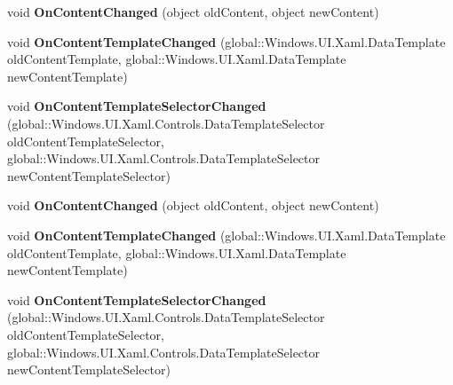 \begin{DoxyCompactItemize}
void {\bfseries On\+Content\+Changed} (object old\+Content, object new\+Content)
\item 
\mbox{\label{interface_windows_1_1_u_i_1_1_xaml_1_1_controls_1_1_i_content_control_overrides_aa589bdda994fa42b1307791c8667e26e}} 
void {\bfseries On\+Content\+Template\+Changed} (global\+::\+Windows.\+U\+I.\+Xaml.\+Data\+Template old\+Content\+Template, global\+::\+Windows.\+U\+I.\+Xaml.\+Data\+Template new\+Content\+Template)
\item 
\mbox{\label{interface_windows_1_1_u_i_1_1_xaml_1_1_controls_1_1_i_content_control_overrides_a5d05f634bc0c8579985bd7fff3790923}} 
void {\bfseries On\+Content\+Template\+Selector\+Changed} (global\+::\+Windows.\+U\+I.\+Xaml.\+Controls.\+Data\+Template\+Selector old\+Content\+Template\+Selector, global\+::\+Windows.\+U\+I.\+Xaml.\+Controls.\+Data\+Template\+Selector new\+Content\+Template\+Selector)
\item 
\mbox{\label{interface_windows_1_1_u_i_1_1_xaml_1_1_controls_1_1_i_content_control_overrides_a927b9318fd0f295313825c3e746af39d}} 
void {\bfseries On\+Content\+Changed} (object old\+Content, object new\+Content)
\item 
\mbox{\label{interface_windows_1_1_u_i_1_1_xaml_1_1_controls_1_1_i_content_control_overrides_aa589bdda994fa42b1307791c8667e26e}} 
void {\bfseries On\+Content\+Template\+Changed} (global\+::\+Windows.\+U\+I.\+Xaml.\+Data\+Template old\+Content\+Template, global\+::\+Windows.\+U\+I.\+Xaml.\+Data\+Template new\+Content\+Template)
\item 
\mbox{\label{interface_windows_1_1_u_i_1_1_xaml_1_1_controls_1_1_i_content_control_overrides_a5d05f634bc0c8579985bd7fff3790923}} 
void {\bfseries On\+Content\+Template\+Selector\+Changed} (global\+::\+Windows.\+U\+I.\+Xaml.\+Controls.\+Data\+Template\+Selector old\+Content\+Template\+Selector, global\+::\+Windows.\+U\+I.\+Xaml.\+Controls.\+Data\+Template\+Selector new\+Content\+Template\+Selector)

\end{DoxyCompactItemize}
